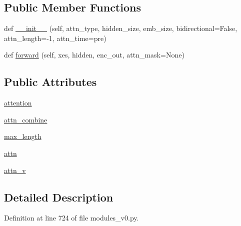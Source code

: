 \subsection*{Public Member Functions}
\begin{DoxyCompactItemize}
\item 
def \hyperlink{classparlai_1_1agents_1_1legacy__agents_1_1seq2seq_1_1modules__v0_1_1AttentionLayer_a454f7b72defa9f2dc7e8efec1ab336eb}{\+\_\+\+\_\+init\+\_\+\+\_\+} (self, attn\+\_\+type, hidden\+\_\+size, emb\+\_\+size, bidirectional=False, attn\+\_\+length=-\/1, attn\+\_\+time=\textquotesingle{}pre\textquotesingle{})
\item 
def \hyperlink{classparlai_1_1agents_1_1legacy__agents_1_1seq2seq_1_1modules__v0_1_1AttentionLayer_a6b5727eb84f3cab62adc1c647e23b98a}{forward} (self, xes, hidden, enc\+\_\+out, attn\+\_\+mask=None)
\end{DoxyCompactItemize}
\subsection*{Public Attributes}
\begin{DoxyCompactItemize}
\item 
\hyperlink{classparlai_1_1agents_1_1legacy__agents_1_1seq2seq_1_1modules__v0_1_1AttentionLayer_a0faa53163c14800b0deda68be978cd76}{attention}
\item 
\hyperlink{classparlai_1_1agents_1_1legacy__agents_1_1seq2seq_1_1modules__v0_1_1AttentionLayer_acd4f27aecfab6e05a026061bdabc42aa}{attn\+\_\+combine}
\item 
\hyperlink{classparlai_1_1agents_1_1legacy__agents_1_1seq2seq_1_1modules__v0_1_1AttentionLayer_ae7aed4fe106be5b39f7cc9027c5673f7}{max\+\_\+length}
\item 
\hyperlink{classparlai_1_1agents_1_1legacy__agents_1_1seq2seq_1_1modules__v0_1_1AttentionLayer_aedd5ce11eba4a46b40bc61a8bdad7e3d}{attn}
\item 
\hyperlink{classparlai_1_1agents_1_1legacy__agents_1_1seq2seq_1_1modules__v0_1_1AttentionLayer_a4659f062cd7e92b2015f2cdf8558449d}{attn\+\_\+v}
\end{DoxyCompactItemize}


\subsection{Detailed Description}


Definition at line 724 of file modules\+\_\+v0.\+py.



